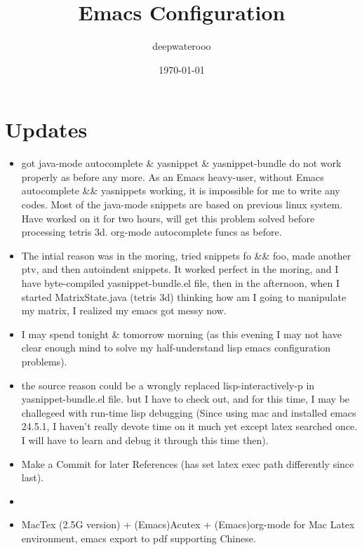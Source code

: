 \documentclass[9pt,b5paper]{article}
\author{deepwaterooo}
\date{\today}
\title{Emacs Configuration}
\begin{document}
\maketitle
\tableofcontents


\section{Updates}
\label{sec-1}
\begin{itemize}
\item got java-mode autocomplete \& yasnippet \& yasnippet-bundle do not work properly as before any more. As an Emacs heavy-user, without Emacs autocomplete \&\& yasnippets working, it is impossible for me to write any codes. Most of the java-mode snippets are based on previous linux system. Have worked on it for two hours, will get this problem solved before processing tetris 3d. org-mode autocomplete funcs as before.
\item The intial reason was in the moring, tried snippets fo \&\& foo, made another ptv, and then autoindent snippets. It worked perfect in the moring, and I have byte-compiled yasnippet-bundle.el file, then in the afternoon, when I started MatrixState.java (tetris 3d) thinking how am I going to manipulate my matrix, I realized my emacs got messy now.
\item I may spend tonight \& tomorrow morning (as this evening I may not have clear enough mind to solve my half-understand lisp emacs configuration problems).
\item the source reason could be a wrongly replaced lisp-interactively-p in yasnippet-bundle.el file. but I have to check out, and for this time, I may be challegeed with run-time lisp debugging (Since using mac and installed emacs 24.5.1, I haven't really devote time on it much yet except latex searched once. I will have to learn and debug it through this time then).
\item Make a Commit for later References (has set latex exec path differently since last).
\item 
\item MacTex (2.5G version) + (Emacs)Acutex +  (Emacs)org-mode for Mac Latex environment, emacs export to pdf supporting Chinese.
\end{itemize}
\end{document}
